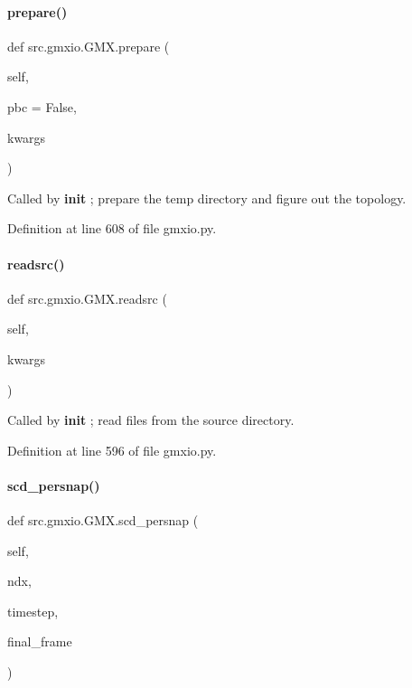 \paragraph{\texorpdfstring{prepare()}{prepare()}}
{\footnotesize\ttfamily def src.\+gmxio.\+G\+M\+X.\+prepare (\begin{DoxyParamCaption}\item[{}]{self,  }\item[{}]{pbc = {\ttfamily False},  }\item[{}]{kwargs }\end{DoxyParamCaption})}



Called by {\bfseries init} ; prepare the temp directory and figure out the topology. 



Definition at line 608 of file gmxio.\+py.

\mbox{\label{classsrc_1_1gmxio_1_1GMX_a276bb887f884865956c49592b21d8f1f}} 
\paragraph{\texorpdfstring{readsrc()}{readsrc()}}
{\footnotesize\ttfamily def src.\+gmxio.\+G\+M\+X.\+readsrc (\begin{DoxyParamCaption}\item[{}]{self,  }\item[{}]{kwargs }\end{DoxyParamCaption})}



Called by {\bfseries init} ; read files from the source directory. 



Definition at line 596 of file gmxio.\+py.

\mbox{\label{classsrc_1_1gmxio_1_1GMX_a8aeaf687eee94c8da3fb33c1e22802d6}} 
\paragraph{\texorpdfstring{scd\+\_\+persnap()}{scd\_persnap()}}
{\footnotesize\ttfamily def src.\+gmxio.\+G\+M\+X.\+scd\+\_\+persnap (\begin{DoxyParamCaption}\item[{}]{self,  }\item[{}]{ndx,  }\item[{}]{timestep,  }\item[{}]{final\+\_\+frame }\end{DoxyParamCaption})}



